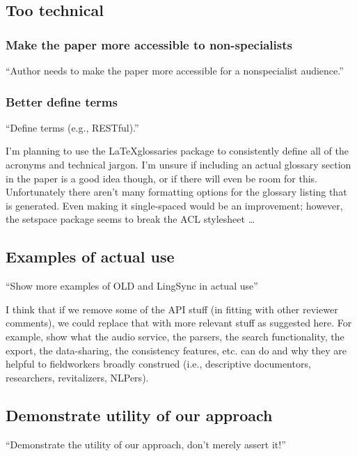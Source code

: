 \documentclass[11pt]{article}
\begin{document}
\subsection{Too technical}

\subsubsection{Make the paper more accessible to non-specialists}

``Author needs to make the paper more accessible for a nonspecialist audience.''


\subsubsection{Better define terms}

``Define terms (e.g., RESTful).''

I'm planning to use the \LaTeX glossaries package to consistently define all of
the acronyms and technical jargon. I'm unsure if including an actual glossary
section in the paper is a good idea though, or if there will even be room for
this. Unfortunately there aren't many formatting options for the glossary listing
that is generated. Even making it single-spaced would be an improvement; however,
the setspace package seems to break the ACL stylesheet \ldots


\subsection{Examples of actual use}

``Show more examples of OLD and LingSync in actual use''

I think that if we remove some of the API stuff (in fitting with other reviewer
comments), we could replace that with more relevant stuff as suggested here. For
example, show what the audio service, the parsers, the search functionality, the
export, the data-sharing, the consistency features, etc. can do and why they are
helpful to fieldworkers broadly construed (i.e., descriptive documentors,
researchers, revitalizers, NLPers).


\subsection{Demonstrate utility of our approach}

``Demonstrate the utility of our approach, don't merely assert it!''
\end{document}
